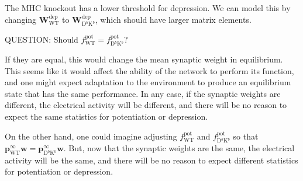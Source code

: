 \documentclass[12pt]{article}
\newcommand{\pr}{\mathbf{p}}
\newcommand{\eq}{\pr^\infty}
\newcommand{\w}{\mathbf{w}}
\newcommand{\W}{\mathbf{W}}
\newcommand{\pot}{^{\text{pot}}}
\newcommand{\dep}{^{\text{dep}}}
\newcommand{\wt}{_{\text{WT}}}
\newcommand{\kn}{_{\text{D$^b$K$^b$}}}
\begin{document}
The MHC knockout has a lower threshold for depression.
We can model this by changing $\W\dep\wt$ to $\W\dep\kn$, which should have larger matrix elements.

QUESTION: Should $f\pot\wt=f\pot\kn$? 

If they are equal, this would change the mean synaptic weight in equilibrium.
This seems like it would affect the ability of the network to perform its function, and one might expect adaptation to the environment to produce an equilibrium state that has the same performance.
In any case, if the synaptic weights are different, the electrical activity will be different, and there will be no reason to expect the same statistics for potentiation or depression.

On the other hand, one could imagine adjusting $f\pot\wt$ and $f\pot\kn$ so that $\eq\wt\w = \eq\kn\w$.
But, now that the synaptic weights are the same, the electrical activity will be the same, and there will be no reason to expect different statistics for potentiation or depression.













\end{document}
